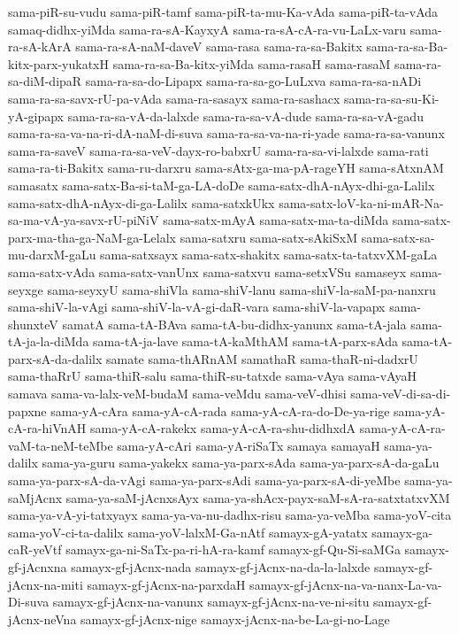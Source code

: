 {sama-piR-su-vudu
sama-piR-tamf
sama-piR-ta-mu-Ka-vAda
sama-piR-ta-vAda
samaq-didhx-yiMda
sama-ra-sA-KayxyA
sama-ra-sA-cA-ra-vu-LaLx-varu
sama-ra-sA-kArA
sama-ra-sA-naM-daveV
sama-rasa
sama-ra-sa-Bakitx
sama-ra-sa-Ba-kitx-parx-yukatxH
sama-ra-sa-Ba-kitx-yiMda
sama-rasaH
sama-rasaM
sama-ra-sa-diM-dipaR
sama-ra-sa-do-Lipapx
sama-ra-sa-go-LuLxva
sama-ra-sa-nADi
sama-ra-sa-savx-rU-pa-vAda
sama-ra-sasayx
sama-ra-sashacx
sama-ra-sa-su-Ki-yA-gipapx
sama-ra-sa-vA-da-lalxde
sama-ra-sa-vA-dude
sama-ra-sa-vA-gadu
sama-ra-sa-va-na-ri-dA-naM-di-suva
sama-ra-sa-va-na-ri-yade
sama-ra-sa-vanunx
sama-ra-saveV
sama-ra-sa-veV-dayx-ro-babxrU
sama-ra-sa-vi-lalxde
sama-rati
sama-ra-ti-Bakitx
sama-ru-darxru
sama-sAtx-ga-ma-pA-rageYH
sama-sAtxnAM
samasatx
sama-satx-Ba-si-taM-ga-LA-doDe
sama-satx-dhA-nAyx-dhi-ga-Lalilx
sama-satx-dhA-nAyx-di-ga-Lalilx
sama-satxkUkx
sama-satx-loV-ka-ni-mAR-Na-sa-ma-vA-ya-savx-rU-piNiV
sama-satx-mAyA
sama-satx-ma-ta-diMda
sama-satx-parx-ma-tha-ga-NaM-ga-Lelalx
sama-satxru
sama-satx-sAkiSxM
sama-satx-sa-mu-darxM-gaLu
sama-satxsayx
sama-satx-shakitx
sama-satx-ta-tatxvXM-gaLa
sama-satx-vAda
sama-satx-vanUnx
sama-satxvu
sama-setxVSu
samaseyx
sama-seyxge
sama-seyxyU
sama-shiVla
sama-shiV-lanu
sama-shiV-la-saM-pa-nanxru
sama-shiV-la-vAgi
sama-shiV-la-vA-gi-daR-vara
sama-shiV-la-vapapx
sama-shunxteV
samatA
sama-tA-BAva
sama-tA-bu-didhx-yanunx
sama-tA-jala
sama-tA-ja-la-diMda
sama-tA-ja-lave
sama-tA-kaMthAM
sama-tA-parx-sAda
sama-tA-parx-sA-da-dalilx
samate
sama-thARnAM
samathaR
sama-thaR-ni-dadxrU
sama-thaRrU
sama-thiR-salu
sama-thiR-su-tatxde
sama-vAya
sama-vAyaH
samava
sama-va-lalx-veM-budaM
sama-veMdu
sama-veV-dhisi
sama-veV-di-sa-di-papxne
sama-yA-cAra
sama-yA-cA-rada
sama-yA-cA-ra-do-De-ya-rige
sama-yA-cA-ra-hiVnAH
sama-yA-cA-rakekx
sama-yA-cA-ra-shu-didhxdA
sama-yA-cA-ra-vaM-ta-neM-teMbe
sama-yA-cAri
sama-yA-riSaTx
samaya
samayaH
sama-ya-dalilx
sama-ya-guru
sama-yakekx
sama-ya-parx-sAda
sama-ya-parx-sA-da-gaLu
sama-ya-parx-sA-da-vAgi
sama-ya-parx-sAdi
sama-ya-parx-sA-di-yeMbe
sama-ya-saMjAcnx
sama-ya-saM-jAcnxsAyx
sama-ya-shAcx-payx-saM-sA-ra-satxtatxvXM
sama-ya-vA-yi-tatxyayx
sama-ya-va-nu-dadhx-risu
sama-ya-veMba
sama-yoV-cita
sama-yoV-ci-ta-dalilx
sama-yoV-lalxM-Ga-nAtf
samayx-gA-yatatx
samayx-ga-caR-yeVtf
samayx-ga-ni-SaTx-pa-ri-hA-ra-kamf
samayx-gf-Qu-Si-saMGa
samayx-gf-jAcnxna
samayx-gf-jAcnx-nada
samayx-gf-jAcnx-na-da-la-lalxde
samayx-gf-jAcnx-na-miti
samayx-gf-jAcnx-na-parxdaH
samayx-gf-jAcnx-na-va-nanx-La-va-Di-suva
samayx-gf-jAcnx-na-vanunx
samayx-gf-jAcnx-na-ve-ni-situ
samayx-gf-jAcnx-neVna
samayx-gf-jAcnx-nige
samayx-jAcnx-na-be-La-gi-no-Lage
}
